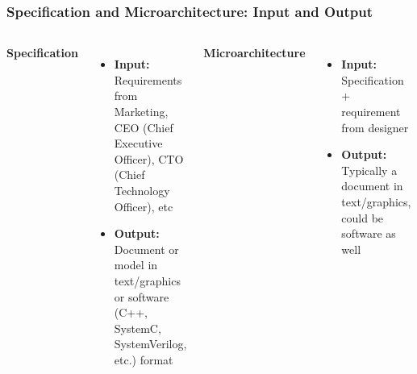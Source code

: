 \documentclass[compress]{beamer}
\begin{document}
\begin{frame}
	\frametitle{Specification and Microarchitecture: Input and Output}
	\begin{columns}	
		\textbf{Specification}
		\begin{itemize}
			\item \textbf{Input:} Requirements from
			Marketing, CEO (Chief Executive
			Officer), CTO (Chief Technology
			Officer), etc
			\item \textbf{Output:} Document or model in
			text/graphics or software (C++,
			SystemC, SystemVerilog, etc.)
			format
		\end{itemize}
	\textbf{Microarchitecture}
	\begin{itemize}
		\item \textbf{Input:}  Specification + requirement from designer
		\item \textbf{Output:} Typically a document in
		text/graphics, could be software
		as well
	\end{itemize}
		\begin{center}
			\includegraphics[width=0.6\textwidth]{spec_micro}
		\end{center}
	\end{columns}
\end{frame}
\end{document}
